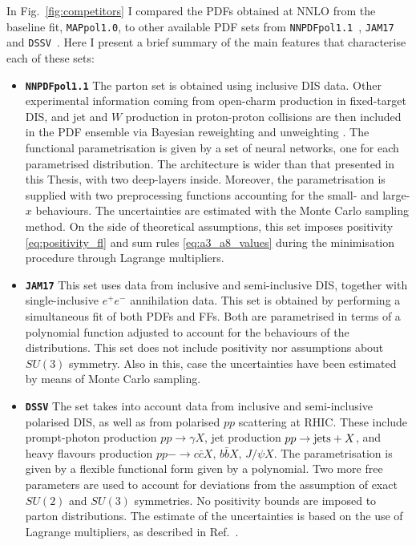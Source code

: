 In Fig.~\ref{fig:competitors} I compared the PDFs obtained at NNLO from the baseline fit, \texttt{MAPpol1.0}, to other available PDF sets from \texttt{NNPDFpol1.1}~\cite{Nocera:2014gqa}, \texttt{JAM17}~\cite{Ethier:2017zbq} and \texttt{DSSV}~\cite{deFlorian:2008mr}. Here I present a brief summary of the main features that characterise each of these sets:
\begin{itemize}
  \item[] \texttt{\textbf{NNPDFpol1.1}} The parton set is obtained using inclusive DIS data. Other experimental information coming from open-charm production in fixed-target DIS, and jet and $W$ production in proton-proton collisions are then included in the PDF ensemble via Bayesian reweighting and unweighting \cite{Ball:2011gg, Ball:2010gb}. The functional parametrisation is given by a set of neural networks, one for each parametrised distribution. The architecture is wider than that presented in this Thesis, with two deep-layers inside. Moreover, the parametrisation is supplied with two preprocessing functions accounting for the small- and large-$x$ behaviours. The uncertainties are estimated with the Monte Carlo sampling method. On the side of theoretical assumptions, this set imposes positivity \eqref{eq:positivity_fl} and sum rules \ref{eq:a3_a8_values} during the minimisation procedure through Lagrange multipliers. 
  \item[] \texttt{\textbf{JAM17}} This set uses data from inclusive and semi-inclusive DIS, together with single-inclusive $e^+ e^-$ annihilation data. This set is obtained by performing a simultaneous fit of both PDFs and FFs. Both are parametrised in terms of a polynomial function adjusted to account for the behaviours of the distributions. This set does not include positivity nor assumptions about $SU(3)$ symmetry. Also in this, case the uncertainties have been estimated by means of Monte Carlo sampling.
  \item[] \texttt{\textbf{DSSV}} The set takes into account data from inclusive and semi-inclusive polarised DIS, as well as from polarised $pp$ scattering at RHIC. These include prompt-photon production $pp \rightarrow \gamma X$, jet production $pp \rightarrow \textrm{jets} + X$, and heavy flavours production $pp -\rightarrow c\bar{c}X, \, b\bar{b}X, \, J/\psi X$. The parametrisation is given by a flexible functional form given by a polynomial. Two more free parameters are used to account for deviations from the assumption of exact $SU(2)$ and $SU(3)$ symmetries. No positivity bounds are imposed to parton distributions. The estimate of the uncertainties is based on the use of Lagrange multipliers, as described in Ref.~\cite{Stump:2001gu}.
\end{itemize}
